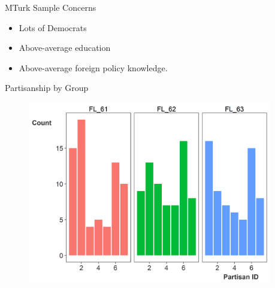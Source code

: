 \documentclass[12pt]{beamer}
\begin{document}

\begin{frame}{MTurk Sample Concerns}

\begin{itemize}
\item Lots of Democrats
\item Above-average education
\item Above-average foreign policy knowledge. 
\end{itemize} 

\end{frame}




\begin{frame}{Partisanship by Group}

\begin{figure}[htbp]
	\centering
		\includegraphics[width=0.95\textwidth]{partisan-group.png}
\end{figure}


\end{frame}

\end{document}
